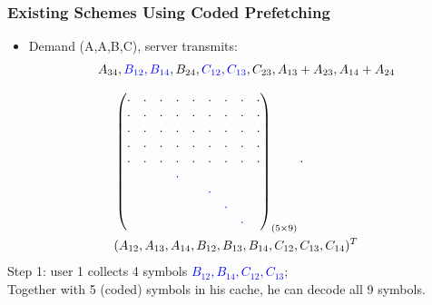 \documentclass{beamer}
\begin{document}
\begin{frame}
\frametitle{Existing Schemes Using Coded Prefetching}
\begin{itemize}
\item Demand (A,A,B,C), server transmits:
\begin{align*}
A_{34}, \textcolor{blue}{B_{12}, B_{14}}, B_{24}, \textcolor{blue}{C_{12},C_{13}}, C_{23},A_{13}+A_{23},A_{14}+A_{24}
\end{align*}
\end{itemize}
\vspace{-10pt}
\begin{align*}
& \begin{pmatrix}
    \cdot   & \cdot  & \cdot  & \cdot &\cdot   & \cdot  & \cdot  & \cdot & \cdot \\
    \cdot   & \cdot  & \cdot  & \cdot &\cdot   & \cdot  & \cdot  & \cdot & \cdot \\
   \cdot   & \cdot  & \cdot  & \cdot &\cdot   & \cdot  & \cdot  & \cdot & \cdot \\
    \cdot   & \cdot  & \cdot  & \cdot &\cdot   & \cdot  & \cdot  & \cdot & \cdot \\
    \cdot   & \cdot  & \cdot  & \cdot &\cdot   & \cdot  & \cdot  & \cdot & \cdot \\
               &           &          &  \textcolor{blue}{\cdot} &         &         &         &           &       \\
                   &            &            &           &            & \textcolor{blue}{\cdot}  &            &   &   \\
                    &            &            &           &            &            & \textcolor{blue}{\cdot}  &   &   \\
                         &            &            &           &            &            &            & \textcolor{blue}{\cdot} &          
\end{pmatrix}_{(5 \times 9)}
\cdot \\
& (A_{12},A_{13},A_{14},B_{12},B_{13},B_{14},C_{12},C_{13},C_{14})^T
\end{align*}
Step 1: user 1 collects 4 symbols \textcolor{blue}{$B_{12}, B_{14},C_{12},C_{13}$};\\
Together with 5 (coded) symbols in his cache, he can decode all 9 symbols.
\end{frame}
\end{document}
